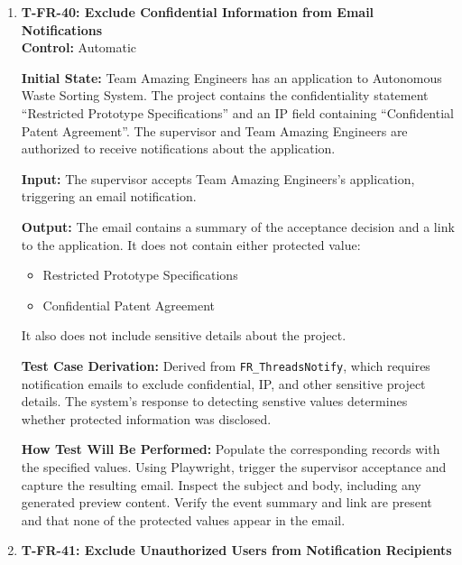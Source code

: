 \documentclass[12pt, titlepage]{article}
\begin{document}
\begin{enumerate}
\textbf{How Test Will Be Performed:} Configure the submitted proposal and enrolled student. Using Playwright, authenticate as Instructor A and approve the proposal. Verify the project appears in the catalog and that the test email service captures the notification sent to Student A.

\item \label{T-FR-40}\textbf{T-FR-40: Exclude Confidential Information from Email Notifications}\\

\textbf{Control:} Automatic

\textbf{Initial State:} Team Amazing Engineers has an application to Autonomous Waste Sorting System. The project contains the confidentiality statement ``Restricted Prototype Specifications'' and an IP field containing ``Confidential Patent Agreement''. The supervisor and Team Amazing Engineers are authorized to receive notifications about the application.

\textbf{Input:} The supervisor accepts Team Amazing Engineers's application, triggering an email notification.

\textbf{Output:} The email contains a summary of the acceptance decision and a link to the application. It does not contain either protected value:
\begin{itemize}
    \item Restricted Prototype Specifications
    \item Confidential Patent Agreement
\end{itemize}
It also does not include sensitive details about the project.

\textbf{Test Case Derivation:} Derived from \texttt{FR\_ThreadsNotify}, which requires notification emails to exclude confidential, IP, and other sensitive project details. The system's response to detecting senstive values determines whether protected information was disclosed.

\textbf{How Test Will Be Performed:} Populate the corresponding records with the specified values. Using Playwright, trigger the supervisor acceptance and capture the resulting email. Inspect the subject and body, including any generated preview content. Verify the event summary and link are present and that none of the protected values appear in the email.

\item \label{T-FR-41}\textbf{T-FR-41: Exclude Unauthorized Users from Notification Recipients}\\


\end{enumerate}
\end{document}
